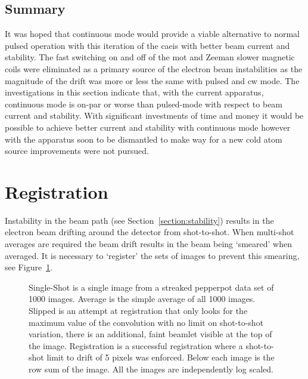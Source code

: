 \subsection{Summary}

It was hoped that continuous mode would provide a viable alternative to normal pulsed operation with this iteration of the \gls{caeis} with better beam current and stability.
The fast switching on and off of the \gls{mot} and Zeeman slower magnetic coils were eliminated as a primary source of the electron beam instabilities as the magnitude of the drift was more or less the same with pulsed and \gls{cw} mode.
The investigations in this section indicate that, with the current apparatus, continuous mode is on-par or worse than pulsed-mode with respect to beam current and stability.
With significant investments of time and money it would be possible to achieve better current and stability with continuous mode however with the apparatus soon to be dismantled to make way for a new cold atom source improvements were not pursued.

\section{Registration}\label{section:registration}

Instability in the beam path (see Section~\ref{section:stability}) results in the electron beam drifting around the detector from shot-to-shot.
When multi-shot averages are required the beam drift results in the beam being `smeared' when averaged.
It is necessary to `register' the sets of images to prevent this smearing, see Figure~\ref{figure:registration_examples}.

\begin{figure}
    \center
    
    \caption[Image registration examples.]{Single-Shot is a single image from a streaked pepperpot data set of 1000 images. Average is the simple average of all 1000 images. Slipped is an attempt at registration that only looks for the maximum value of the convolution with no limit on shot-to-shot variation, there is an additional, faint beamlet visible at the top of the image. Registration is a successful registration where a shot-to-shot limit to drift of 5 pixels was enforced. Below each image is the row sum of the image. All the images are independently log scaled.}
    \label{figure:registration_examples}
\end{figure}

